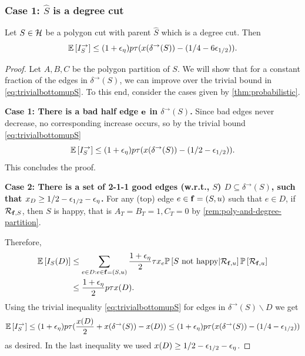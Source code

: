 \subsubsection{Case 1: $\hat{S}$ is a degree cut}
\label{sec:BT}
\begin{lemma}
\label{lem:BT}
Let $S\in \mathcal{H}$  be a polygon cut with parent $\hat S$ which is a degree cut. Then
$$	{\mathbb{E}}\left[I^\rightarrow_S\right] \le  (1+{\epsilon}_\eta)p\tau (x(\delta^\rightarrow(S))-(1/4-6{\epsilon}_{1/2})).$$
\end{lemma}
\begin{proof}
 Let $A,B,C$ be the polygon partition of $S$.
 We will show that for a constant fraction of the edges in $\delta ^\rightarrow (S)$, we can improve over the trivial bound in \eqref{eq:trivialbottomupS}.
To this end, consider the cases given by \cref{thm:probabilistic}.

{\bf Case 1: There is a bad half edge ${\bf e}$ in $\delta ^\rightarrow(S)$.}
Since bad edges never decrease, no corresponding increase occurs, so by the trivial bound \cref{eq:trivialbottomupS}
$${\mathbb{E}}\left[I_{S}^\rightarrow\right] \leq  (1+{\epsilon}_\eta) p\tau(x(\delta^\rightarrow(S))-(1/2-{\epsilon}_{1/2})) .$$
This concludes the proof.

{\bf Case 2: There is a set of  2-1-1 good edges  (w.r.t., $S$) $D\subseteq  \delta^\rightarrow (S)$, such that $x_{D} \ge 1/2 - {\epsilon}_{1/2}-{\epsilon}_\eta$.} 
For any (top) edge $e\in {\bf f}=(S,u)$ such that $e \in D$, %
if ${\mathcal{R}}_{{\bf f},S}$, then %
 $S$ is happy, that is $A_T=B_T=1, C_T=0$ by \cref{rem:poly-and-degree-partition}.

Therefore,
\begin{align*}
{\mathbb{E}}\left[I_{S}(D)\right] &\le \sum_{e\in D: e\in {\bf f}=(S,u)} \frac{1+{\epsilon}_\eta}{2}\tau x_e {\mathbb{P}}\left[S\text{ not happy} | {\mathcal{R}}_{{\bf f},u}\right]{\mathbb{P}}\left[{\mathcal{R}}_{{\bf f},u}\right] \\
&\leq \frac{1+{\epsilon}_\eta}{2} p \tau x(D).
\end{align*}
Using the trivial inequality \cref{eq:trivialbottomupS} for edges in $\delta^\rightarrow(S)\smallsetminus D$ we get
$$ {\mathbb{E}}\left[I^\rightarrow_S\right] \leq (1+{\epsilon}_\eta) p\tau (\frac{x(D)}{2}+x(\delta^\rightarrow(S))-x(D)) \leq (1+{\epsilon}_\eta)p\tau (x(\delta^\rightarrow(S))-(1/4-{\epsilon}_{1/2}))$$
as desired. In the last inequality we used $x(D)\geq 1/2-{\epsilon}_{1/2}-{\epsilon}_\eta$.



\end{proof}
